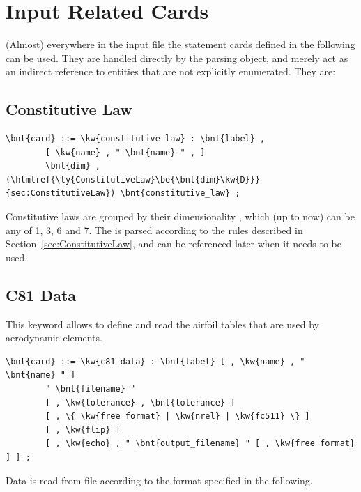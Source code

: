 \section{Input Related Cards} 
(Almost) everywhere in the input file the statement cards defined 
in the following can be used.
They are handled directly by the parsing object, and merely act as
an indirect reference to entities that are not explicitly enumerated.
They are:



\subsection{Constitutive Law}\label{sec:CONSTITUTIVE-LAW}
\begin{Verbatim}[commandchars=\\\{\}]
    \bnt{card} ::= \kw{constitutive law} : \bnt{label} ,
        [ \kw{name} , " \bnt{name} " , ]
        \bnt{dim} , (\htmlref{\ty{ConstitutiveLaw}\be{\bnt{dim}\kw{D}}}{sec:ConstitutiveLaw}) \bnt{constitutive_law} ;
\end{Verbatim}
Constitutive laws are grouped by their dimensionality ,
which (up to now) can be any of 1, 3, 6 and 7.
The  is parsed according to the rules
described in Section~\ref{sec:ConstitutiveLaw},
and can be referenced later when it needs to be used.



\subsection{C81 Data}\label{sec:C81-DATA}
This keyword allows to define and read the  
airfoil tables that are used by aerodynamic elements.
\begin{Verbatim}[commandchars=\\\{\}]
    \bnt{card} ::= \kw{c81 data} : \bnt{label} [ , \kw{name} , " \bnt{name} " ]
        " \bnt{filename} "
        [ , \kw{tolerance} , \bnt{tolerance} ]
        [ , \{ \kw{free format} | \kw{nrel} | \kw{fc511} \} ]
        [ , \kw{flip} ]
        [ , \kw{echo} , " \bnt{output_filename} " [ , \kw{free format} ] ] ;
\end{Verbatim}
Data is read from file  according to the format specified
in the following.

